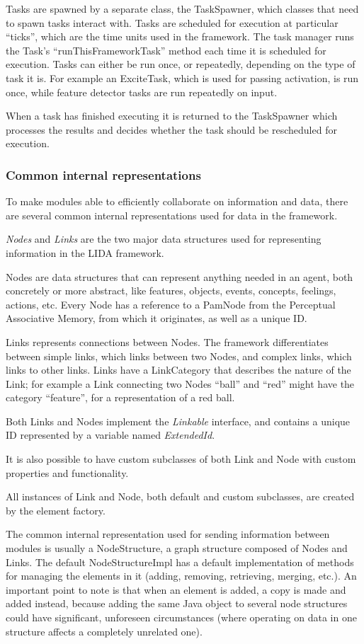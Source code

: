 Tasks are spawned by a separate class, the TaskSpawner, which classes that need to spawn tasks interact with. Tasks are scheduled for execution at particular ``ticks'', which are the time units used in the framework. The task manager runs the Task's ``runThisFrameworkTask'' method each time it is scheduled for execution. Tasks can either be run once, or repeatedly, depending on the type of task it is. For example an ExciteTask, which is used for passing activation, is run once, while feature detector tasks are run repeatedly on input.

When a task has finished executing it is returned to the TaskSpawner which processes the results and decides whether the task should be rescheduled for execution.

\subsubsection{Common internal representations}
To make modules able to efficiently collaborate on information and data, there are several common internal representations used for data in the framework.

{\em Nodes} and {\em Links} are the two major data structures used for representing information in the LIDA framework.

Nodes are data structures that can represent anything needed in an agent, both concretely or more abstract, like features, objects, events, concepts, feelings, actions, etc. Every Node has a reference to a PamNode from the Perceptual Associative Memory, from which it originates, as well as a unique ID.

Links represents connections between Nodes. The framework differentiates between simple links, which links between two Nodes, and complex links, which links to other links. Links have a LinkCategory that describes the nature of the Link; for example a Link connecting two Nodes ``ball'' and ``red'' might have the category ``feature'', for a representation of a red ball.

Both Links and Nodes implement the {\em Linkable} interface, and contains a unique ID represented by a variable named {\em ExtendedId}.

It is also possible to have custom subclasses of both Link and Node with custom properties and functionality.

All instances of Link and Node, both default and custom subclasses, are created by the element factory.

The common internal representation used for sending information between modules is usually a NodeStructure, a graph structure composed of Nodes and Links. The default NodeStructureImpl has a default implementation of methods for managing the elements in it (adding, removing, retrieving, merging, etc.). An important point to note is that when an element is added, a copy is made and added instead, because adding the same Java object to several node structures could have significant, unforeseen circumstances (where operating on data in one structure affects a completely unrelated one).

